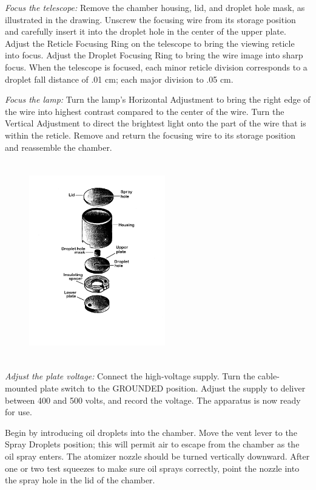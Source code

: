 \emph{Focus the telescope:} Remove the chamber housing, lid, and droplet
hole mask, as illustrated in the drawing. Unscrew the focusing wire from
its storage position and carefully insert it into the droplet hole in
the center of the upper plate. Adjust the Reticle Focusing Ring on the
telescope to bring the viewing reticle into focus. Adjust the Droplet
Focusing Ring to bring the wire image into sharp focus. When the
telescope is focused, each minor reticle division corresponds to a
droplet fall distance of .01 cm; each major division to .05 cm.

\emph{Focus the lamp:} Turn the lamp's Horizontal Adjustment to bring
the right edge of the wire into highest contrast compared to the center
of the wire. Turn the Vertical Adjustment to direct the brightest light
onto the part of the wire that is within the reticle. Remove and return
the focusing wire to its storage position and reassemble the chamber.

\begin{figure} %
  \begin{center}
    \includegraphics[width=2.33056in,height=3.38264in]{images/03_millikan/image067.png}
  \end{center}
\end{figure}

\emph{Adjust the plate voltage:} Connect the high-voltage supply. Turn
the cable-mounted plate switch to the GROUNDED position. Adjust the
supply to deliver between 400 and 500 volts, and record the voltage. The
apparatus is now ready for use.

Begin by introducing oil droplets into the chamber. Move the vent lever
to the Spray Droplets position; this will permit air to escape from the
chamber as the oil spray enters. The atomizer nozzle should be turned
vertically downward. After one or two test squeezes to make sure oil
sprays correctly, point the nozzle into the spray hole in the lid of the
chamber.

